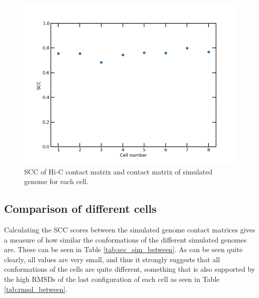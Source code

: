 \documentclass[10pt,abstract=true,titlepage=false,toc=bib]{scrartcl}
\begin{document}
\begin{figure}[ht]
\centering
	\includegraphics[width=14cm]{hic-vs-sim-scc.png}
	\caption{SCC of Hi-C contact matrix and contact matrix of simulated genome for each cell.}
	\label{img:hic-vs-sim-scc}
\end{figure}


\subsection{Comparison of different cells} %
\label{sub:comparison_of_different_cells}

Calculating the SCC scores between the simulated genome contact matrices gives a measure of how similar the conformations of the different simulated genomes are. These can be seen in Table \ref{tab:scc_sim_between}. As can be seen quite clearly, all values are very small, and thus it strongly suggests that all conformations of the cells are quite different, something that is also supported by the high RMSDs of the last configuration of each cell as seen in Table \ref{tab:rmsd_between}.
\end{document}

